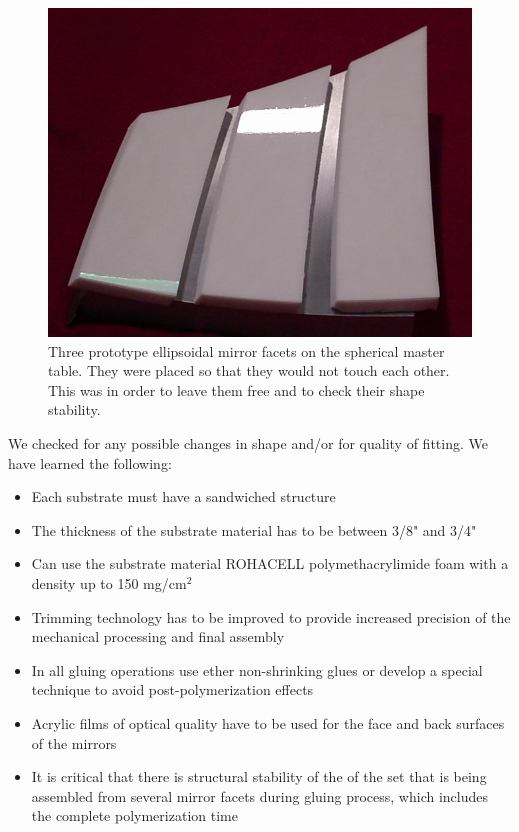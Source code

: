 \begin{figure}[ht]
    \centering
    \includegraphics[width=1.0\linewidth]{images/Prototype.png}
    \caption{Three prototype ellipsoidal mirror facets on the spherical master table. They were placed so that they would not touch each other. This was in order to leave them free and to check their shape stability.}
    \label{fig:Prototype}
\end{figure}
We checked for any possible changes in shape and/or for quality of fitting. We have learned the following:

\begin{itemize}
    \item Each substrate must have a sandwiched structure
    \item The thickness of the substrate material has to be between 3/8" and 3/4"
    \item Can use the substrate material ROHACELL polymethacrylimide foam with a density up to 150 mg/cm$^2$
    \item Trimming technology has to be improved to provide increased precision of the mechanical processing and final assembly
    \item In all gluing operations use ether non-shrinking glues or develop a special technique to avoid post-polymerization effects
    \item Acrylic films of optical quality have to be used for the face and back surfaces of the mirrors
    \item It is critical that there is structural stability of the of the set that is being assembled from several mirror facets during gluing process, which includes the complete polymerization time
    \end{itemize}

